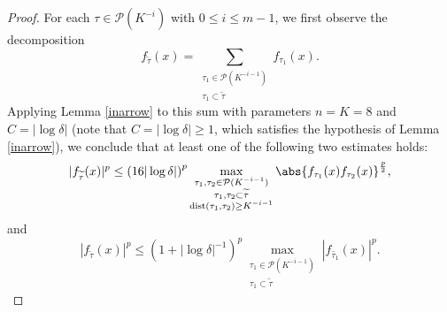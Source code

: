 \documentclass[reqno,centertags,11pt,a4paper]{amsart}
\begin{document}
\begin{proof}
For each $\tau\in \mathcal{P}(K^{-i})$ with $0\leq i\leq m-1$, we first observe the decomposition
\begin{equation*}
    f_{\widetilde{\tau}}(x) = \sum_{\substack{ \tau_1 \in \mathcal{P}(K^{-i-1}) \\ \tau_1\subset {\widetilde{\tau}}}} f_{\tau_1}(x).
\end{equation*}
Applying Lemma \ref{inarrow} to this sum with parameters $n=K=8$ and $C=|\log\delta|$ (note that $C=|\log\delta|\geq1$, which satisfies the hypothesis of Lemma \ref{inarrow}), we conclude that at least one of the following two estimates holds:
\begin{equation}
    |f_{\widetilde{\tau}}(x)|^p \leq \left(16|\log\delta|\right)^p
        \max_{\substack{ \tau_1,\tau_2 \in \mathcal{P}(K^{-i-1}) \\
                        \tau_1,\tau_2 \subset {\widetilde{\tau}} \\
                        \operatorname{dist}(\tau_1,\tau_2) \geq  K^{-i-1} }}
        \abs{f_{\tau_1}(x)f_{\tau_2}(x)}^{\frac{p}{2}},
\end{equation}
and
\begin{equation}
    |f_{\widetilde{\tau}}(x)|^p \leq \left(1+|\log\delta|^{-1}\right)^p
        \max_{\substack{ \tau_1 \in \mathcal{P}(K^{-i-1}) \\
                        \tau_1\subset {\widetilde{\tau}}}} |f_{\widetilde{\tau_1}}(x)|^p.
\end{equation}


\end{proof}
\end{document}
